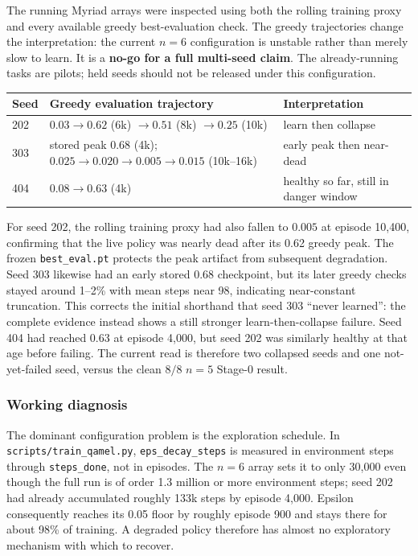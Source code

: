 \documentclass[11pt]{article}
\newcommand{\code}[1]{\texttt{#1}}
\newcommand{\file}[1]{\texttt{\small #1}}
\begin{document}
The running Myriad arrays were inspected using both the rolling training proxy
and every available greedy best-evaluation check. The greedy trajectories change
the interpretation: the current $n=6$ configuration is unstable rather than
merely slow to learn. It is a \textbf{no-go for a full multi-seed claim}. The
already-running tasks are pilots; held seeds should not be released under this
configuration.

\begin{center}
\small
\begin{tabular}{p{}p{}p{}}
\toprule
Seed & Greedy evaluation trajectory & Interpretation \\
\midrule
202 & $0.03 \rightarrow 0.62$ (6k) $\rightarrow 0.51$ (8k) $\rightarrow 0.25$ (10k)
    & learn then collapse \\
303 & stored peak $0.68$ (4k); $0.025 \rightarrow 0.020 \rightarrow 0.005 \rightarrow 0.015$ (10k--16k)
    & early peak then near-dead \\
404 & $0.08 \rightarrow 0.63$ (4k)
    & healthy so far, still in danger window \\
\bottomrule
\end{tabular}
\end{center}

For seed 202, the rolling training proxy had also fallen to $0.005$ at episode
10{,}400, confirming that the live policy was nearly dead after its 0.62 greedy
peak. The frozen \file{best\_eval.pt} protects the peak artifact from subsequent
degradation. Seed 303 likewise had an early stored 0.68 checkpoint, but its
later greedy checks stayed around 1--2\% with mean steps near 98, indicating
near-constant truncation. This corrects the initial shorthand that seed 303
``never learned'': the complete evidence instead shows a still stronger
learn-then-collapse failure. Seed 404 had reached 0.63 at episode 4{,}000, but
seed 202 was similarly healthy at that age before failing. The current read is
therefore two collapsed seeds and one not-yet-failed seed, versus the clean
$8/8$ $n=5$ Stage-0 result.

\subsubsection*{Working diagnosis}

The dominant configuration problem is the exploration schedule. In
\file{scripts/train\_qamel.py}, \code{eps\_decay\_steps} is measured in
environment steps through \code{steps\_done}, not in episodes. The $n=6$ array
sets it to only 30{,}000 even though the full run is of order 1.3 million or more
environment steps; seed 202 had already accumulated roughly 133k steps by
episode 4{,}000. Epsilon consequently reaches its 0.05 floor by roughly episode
900 and stays there for about 98\% of training. A degraded policy therefore has
almost no exploratory mechanism with which to recover.
\end{document}
